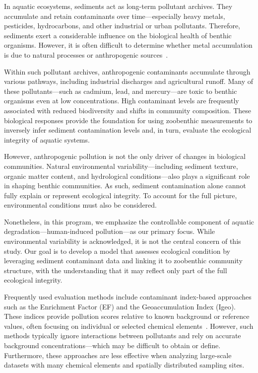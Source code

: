 
In aquatic ecosystems, sediments act as long-term pollutant archives. They accumulate and retain contaminants over time—especially 
heavy metals, pesticides, hydrocarbons, and other industrial or urban pollutants. Therefore, sediments exert a considerable influence 
on the biological health of benthic organisms. However, it is often difficult to determine whether metal accumulation is due to
 natural processes or anthropogenic sources~\cite{Birch2007}.


Within such pollutant archives, anthropogenic contaminants accumulate through various pathways, including industrial 
discharges and agricultural runoff. Many of these pollutants—such as cadmium, lead, and mercury—are toxic to benthic organisms
 even at low concentrations. High contaminant levels are frequently associated with reduced biodiversity and shifts in community composition. 
 These biological responses provide the foundation for using zoobenthic measurements to inversely infer sediment contamination levels and, 
 in turn, evaluate the ecological integrity of aquatic systems.

However, anthropogenic pollution is not the only driver of changes in biological communities. Natural environmental 
variability—including sediment texture, organic matter content, and hydrological conditions—also plays a significant 
role in shaping benthic communities. As such, sediment contamination alone cannot fully explain or represent ecological 
integrity. To account for the full picture, environmental conditions must also be considered.

Nonetheless, in this program, we emphasize the controllable component of aquatic degradation—human-induced 
pollution—as our primary focus. While environmental variability is acknowledged, it is not the central concern of this study.
Our goal is to develop a model that assesses ecological condition by leveraging sediment contaminant data and linking it to 
zoobenthic community structure, with the understanding that it may reflect only part of the full ecological integrity.


Frequently used evaluation methods include contaminant index-based approaches such as the Enrichment Factor (EF) and the
Geoaccumulation Index (Igeo). These indices provide pollution scores relative to known background or reference values, 
often focusing on individual or selected chemical elements~\cite{Birch2022Review}. However, such methods typically ignore 
interactions between pollutants and rely on accurate background concentrations—which may be difficult to obtain or define.
Furthermore, these approaches are less effective when analyzing large-scale datasets with many chemical elements and spatially distributed sampling sites.

